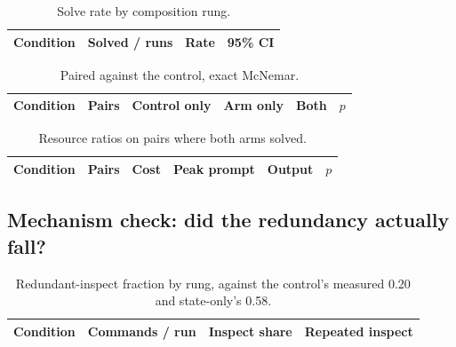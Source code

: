 \begin{table}[t]
\centering
\caption{Solve rate by composition rung.}
\label{tab:ladder-solve}
\begin{tabular}{@{}lrrr@{}}
\toprule
Condition & Solved / runs & Rate & 95\% CI \\
\midrule

\bottomrule
\end{tabular}
\end{table}

\begin{table}[t]
\centering
\caption{Paired against the control, exact McNemar.}
\label{tab:ladder-paired}
\begin{tabular}{@{}lrrrrr@{}}
\toprule
Condition & Pairs & Control only & Arm only & Both & $p$ \\
\midrule

\bottomrule
\end{tabular}
\end{table}

\begin{table}[t]
\centering
\caption{Resource ratios on pairs where both arms solved.}
\label{tab:ladder-cost}
\begin{tabular}{@{}lrrrrr@{}}
\toprule
Condition & Pairs & Cost & Peak prompt & Output & $p$ \\
\midrule

\bottomrule
\end{tabular}
\end{table}


\subsection{Mechanism check: did the redundancy actually fall?}

\begin{table}[t]
\centering
\caption{Redundant-inspect fraction by rung, against the control's measured
\num{0.20} and state-only's \num{0.58}.}
\label{tab:ladder-redundancy}
\begin{tabular}{@{}lrrr@{}}
\toprule
Condition & Commands / run & Inspect share & Repeated inspect \\
\midrule

\bottomrule
\end{tabular}
\end{table}

